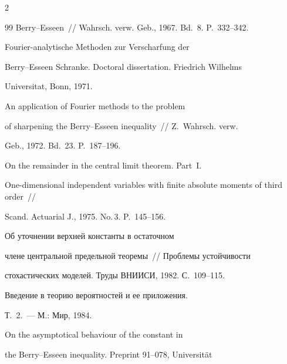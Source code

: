 \begin{multicols}{2}
{{\begin{thebibliography}{99}
Berry--Esseen~// Wahrsch. verw. Geb., 1967. Bd.~8. P.~332--342.









Fourier-analytische Methoden zur Verscharfung der


Berry--Esseen Schranke. Doctoral dissertation. Friedrich Wilhelms


Universitat, Bonn, 1971.







 An application of Fourier methods to the problem


of sharpening the Berry--Esseen inequality~// Z.~Wahrsch. verw.


Geb., 1972. Bd.~23. P.~187--196.







 On the remainder in the central limit theorem. Part~I.


One-dimensional independent variables with finite absolute moments of third order~//


Scand. Actuarial J., 1975. No.\,3. P.~145--156.







 Об уточнении верхней константы в остаточном


члене центральной предельной теоремы~// Проблемы устойчивости


стохастических моделей. Труды ВНИИСИ, 1982. С.~109--115.







 Введение в теорию вероятностей и ее приложения.


Т.~2.~--- М.: Мир, 1984.







 On the asymptotical behaviour of the constant in


the Berry--Esseen inequality. Preprint 91--078, Universit\"at



\end{thebibliography}}}
\end{multicols}
